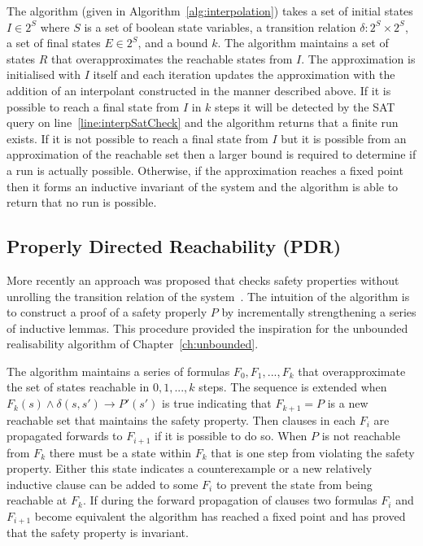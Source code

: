 The algorithm (given in Algorithm~\ref{alg:interpolation}) takes a set of initial states $I \in 2^S$ where $S$ is a set of boolean state variables, a transition relation $\delta : 2^S \times 2^S$, a set of final states $E \in 2^S$, and a bound $k$. The algorithm maintains a set of states $R$ that overapproximates the reachable states from $I$. The approximation is initialised with $I$ itself and each iteration updates the approximation with the addition of an interpolant constructed in the manner described above. If it is possible to reach a final state from $I$ in $k$ steps it will be detected by the SAT query on line~\ref{line:interpSatCheck} and the algorithm returns that a finite run exists. If it is not possible to reach a final state from $I$ but it is possible from an approximation of the reachable set then a larger bound is required to determine if a run is actually possible. Otherwise, if the approximation reaches a fixed point then it forms an inductive invariant of the system and the algorithm is able to return that no run is possible.

\subsection{Properly Directed Reachability (PDR)}
\label{sec:pdr}

More recently an approach was proposed that checks safety properties without unrolling the transition relation of the system~\cite{Bradley11}. The intuition of the algorithm is to construct a proof of a safety properly $P$ by incrementally strengthening a series of inductive lemmas. This procedure provided the inspiration for the unbounded realisability algorithm of Chapter~\ref{ch:unbounded}.

The algorithm maintains a series of formulas $F_0, F_1, ..., F_k$ that overapproximate the set of states reachable in $0, 1, ..., k$ steps. The sequence is extended when $F_k(s) \land \delta(s, s') \to P'(s')$ is true indicating that $F_{k+1} = P$ is a new reachable set that maintains the safety property. Then clauses in each $F_i$ are propagated forwards to $F_{i+1}$ if it is possible to do so. When $P$ is not reachable from $F_k$ there must be a state within $F_k$ that is one step from violating the safety property. Either this state indicates a counterexample or a new relatively inductive clause can be added to some $F_i$ to prevent the state from being reachable at $F_k$. If during the forward propagation of clauses two formulas $F_i$ and $F_{i+1}$ become equivalent the algorithm has reached a fixed point and has proved that the safety property is invariant.

